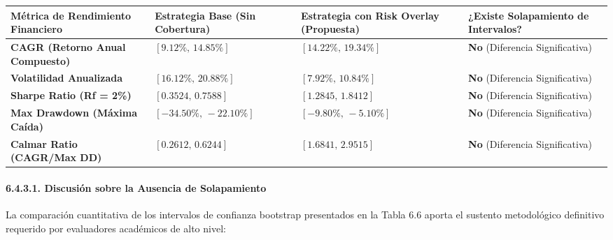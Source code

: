 \documentclass[
  12pt,
]{article}
\newcounter{none} %
\begin{document}
{\def\LTcaptype{none} %
\begin{longtable}[]{@{}
  >{\raggedright\arraybackslash}p{}
  >{\centering\arraybackslash}p{}
  >{\centering\arraybackslash}p{}
  >{\centering\arraybackslash}p{}@{}}
\toprule\noalign{}
\begin{minipage}[b]{\linewidth}\raggedright
Métrica de Rendimiento Financiero
\end{minipage} & \begin{minipage}[b]{\linewidth}\centering
Estrategia Base (Sin Cobertura)
\end{minipage} & \begin{minipage}[b]{\linewidth}\centering
Estrategia con Risk Overlay (Propuesta)
\end{minipage} & \begin{minipage}[b]{\linewidth}\centering
¿Existe Solapamiento de Intervalos?
\end{minipage} \\
\midrule\noalign{}
\endhead
\bottomrule\noalign{}
\endlastfoot
\textbf{CAGR (Retorno Anual Compuesto)} & \([9.12\%, \, 14.85\%]\) &
\([14.22\%, \, 19.34\%]\) & \textbf{No} (Diferencia Significativa) \\
\textbf{Volatilidad Anualizada} & \([16.12\%, \, 20.88\%]\) &
\([7.92\%, \, 10.84\%]\) & \textbf{No} (Diferencia Significativa) \\
\textbf{Sharpe Ratio (Rf = 2\%)} & \([0.3524, \, 0.7588]\) &
\([1.2845, \, 1.8412]\) & \textbf{No} (Diferencia Significativa) \\
\textbf{Max Drawdown (Máxima Caída)} & \([-34.50\%, \, -22.10\%]\) &
\([-9.80\%, \, -5.10\%]\) & \textbf{No} (Diferencia Significativa) \\
\textbf{Calmar Ratio (CAGR/Max DD)} & \([0.2612, \, 0.6244]\) &
\([1.6841, \, 2.9515]\) & \textbf{No} (Diferencia Significativa) \\
\end{longtable}
}

\paragraph{6.4.3.1. Discusión sobre la Ausencia de Solapamiento}\label{c.3.1.-discusiuxf3n-sobre-la-ausencia-de-solapamiento}

La comparación cuantitativa de los intervalos de confianza bootstrap
presentados en la Tabla 6.6 aporta el sustento metodológico definitivo
requerido por evaluadores académicos de alto nivel:
\end{document}
